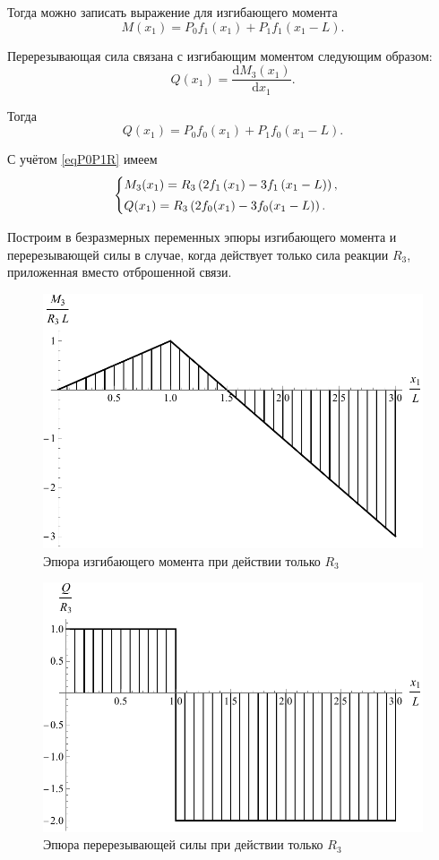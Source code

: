 \documentclass[12pt, a4paper]{article}
\begin{document}
	Тогда можно записать выражение для изгибающего момента
	\[
	M(x_1) = P_0 f_1(x_1) + P_1 f_1(x_1 - L).
	\]
	
	Перерезывающая сила связана с изгибающим моментом следующим образом:
	\begin{equation}
		Q(x_1) = \dfrac{\mathrm{d} M_3(x_1)}{\mathrm{d} x_1}.
		\label{eqQ}
	\end{equation}
	
	Тогда
	\[
	Q(x_1) = P_0 f_0(x_1) + P_1 f_0(x_1 - L).
	\]
	
	С учётом \eqref{eqP0P1R} имеем
	\begin{equation}
		\begin{cases} \vspace{0.25em}
			M_3(x_1) = R_3 \left( 2 f_1\left(x_1\right) - 3 f_1\left(x_1 - L\right) \right), \\
			Q(x_1) = R_3 \left( 2f_0(x_1) - 3 f_0(x_1 - L) \right). \\
		\end{cases}
		\label{eqM3QR}
	\end{equation}
	
	Построим в безразмерных переменных эпюры изгибающего момента и перерезывающей силы в случае, когда действует только сила реакции $R_3$, приложенная вместо отброшенной связи.
	
	\begin{figure}[!h]
		\centering
		\includegraphics[width=0.75\linewidth]{plot-5}
		\caption{Эпюра изгибающего момента при действии только $R_3$}
	\end{figure} 
	
	\newpage
	
	\begin{figure}[!h]
		\centering
		\includegraphics[width=0.75\linewidth]{plot-6}
		\caption{Эпюра перерезывающей силы при действии только $R_3$}
	\end{figure}
	
\end{document}

